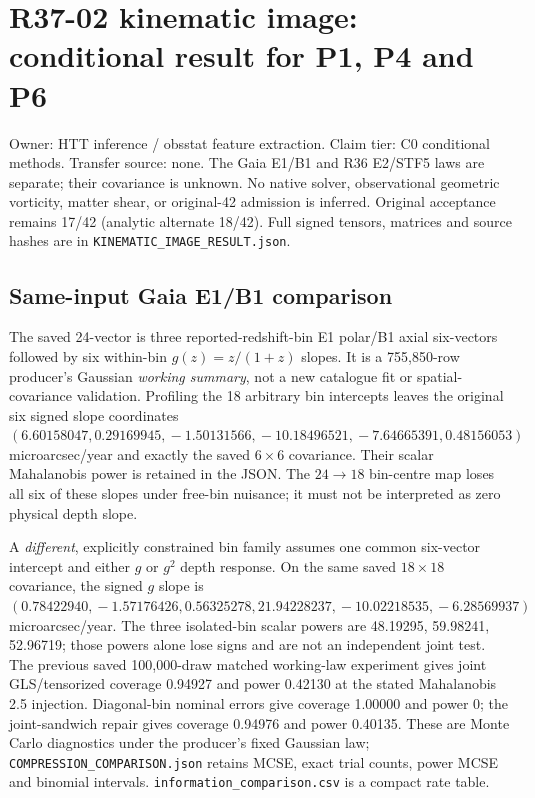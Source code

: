 \documentclass[
]{article}
\author{}
\date{}
\begin{document}
\hypertarget{r37-02-kinematic-image-conditional-result-for-p1-p4-and-p6}{%
\section{R37-02 kinematic image: conditional result for P1, P4 and
P6}\label{r37-02-kinematic-image-conditional-result-for-p1-p4-and-p6}}

Owner: HTT inference / obsstat feature extraction. Claim tier: C0
conditional methods. Transfer source: none. The Gaia E1/B1 and R36
E2/STF5 laws are separate; their covariance is unknown. No native
solver, observational geometric vorticity, matter shear, or original-42
admission is inferred. Original acceptance remains 17/42 (analytic
alternate 18/42). Full signed tensors, matrices and source hashes are in
\texttt{KINEMATIC\_IMAGE\_RESULT.json}.

\hypertarget{same-input-gaia-e1b1-comparison}{%
\subsection{Same-input Gaia E1/B1
comparison}\label{same-input-gaia-e1b1-comparison}}

The saved 24-vector is three reported-redshift-bin E1 polar/B1 axial
six-vectors followed by six within-bin \(g(z)=z/(1+z)\) slopes. It is a
755,850-row producer's Gaussian \emph{working summary}, not a new
catalogue fit or spatial-covariance validation. Profiling the 18
arbitrary bin intercepts leaves the original six signed slope
coordinates
\((6.60158047,\allowbreak{}0.29169945,\allowbreak{}-1.50131566,\allowbreak{}-10.18496521,\allowbreak{}-7.64665391,\allowbreak{}0.48156053)\)
microarcsec/year and exactly the saved \(6\times6\) covariance. Their
scalar Mahalanobis power is retained in the JSON. The \(24\to18\)
bin-centre map loses all six of these slopes under free-bin nuisance; it
must not be interpreted as zero physical depth slope.

A \emph{different}, explicitly constrained bin family assumes one common
six-vector intercept and either \(g\) or \(g^2\) depth response. On the
same saved \(18\times18\) covariance, the signed \(g\) slope is
\((0.78422940,\allowbreak{}-1.57176426,\allowbreak{}0.56325278,\allowbreak{}21.94228237,\allowbreak{}-10.02218535,\allowbreak{}-6.28569937)\)
microarcsec/year. The three isolated-bin scalar powers are 48.19295,
59.98241, 52.96719; those powers alone lose signs and are not an
independent joint test. The previous saved 100,000-draw matched
working-law experiment gives joint GLS/tensorized coverage 0.94927 and
power 0.42130 at the stated Mahalanobis 2.5 injection. Diagonal-bin
nominal errors give coverage 1.00000 and power 0; the joint-sandwich
repair gives coverage 0.94976 and power 0.40135. These are Monte Carlo
diagnostics under the producer's fixed Gaussian law;
\texttt{COMPRESSION\_COMPARISON.json} retains MCSE, exact trial counts,
power MCSE and binomial intervals. \texttt{information\_comparison.csv}
is a compact rate table.
\end{document}
